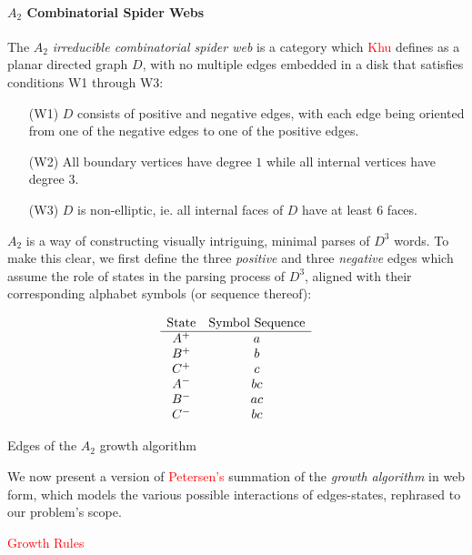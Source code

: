 \documentclass[nonatbib,numbers,10pt]{sigplanconf}
\newcommand\todo[1]{\textcolor{red}{#1}}
\begin{document}
\paragraph{$A_2$ Combinatorial Spider Webs}
The $A_2$ \textit{irreducible combinatorial spider web} is a category which \todo{Khu} defines as a planar directed graph $D$, with no multiple edges embedded in a disk that satisfies conditions W1 through W3:
\begin{enumerate}
\item[(W1)] $D$ consists of positive and negative edges, with each edge being oriented from one of the negative edges to one of the positive edges. 
\item[(W2)] All boundary vertices have degree $1$ while all internal vertices have degree $3$.
\item[(W3)] $D$ is non-elliptic, ie. all internal faces of $D$ have at least $6$ faces.
\end{enumerate}

$A_2$ is a way of constructing visually intriguing, minimal parses of $D^3$ words. To make this clear, we first define the three \textit{positive} and three \textit{negative} edges which assume the role of states in the parsing process of $D^3$, aligned with their corresponding alphabet symbols (or sequence thereof):
\begin{table}[h!]
\[\begin{array}{c c}
$State$ & $Symbol Sequence$\\
\hline
A^{+} & a\\
B^{+} & b\\
C^{+} & c\\
A^{-} & bc\\
B^{-} & ac\\
C^{-} & bc\\
\end{array}\]
\caption{Edges of the $A_2$ growth algorithm}
\end{table}

We now present a version of \todo{Petersen's} summation of the \textit{growth algorithm} in web form, which models the various possible interactions of edges-states, rephrased to our problem's scope.

\todo{Growth Rules}
\end{document}
